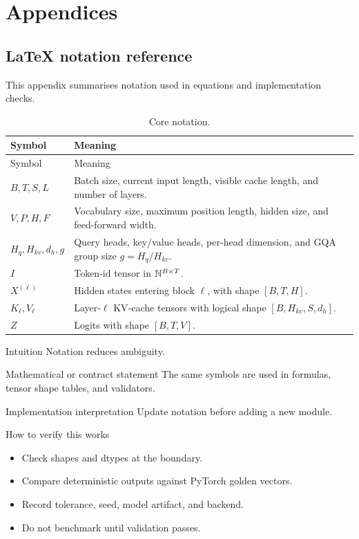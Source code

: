 \part{Appendices}

\chapter{LaTeX notation reference}
\label{app:notation}
This appendix summarises notation used in equations and implementation checks.


{\small
\begin{longtable}{L{0.22\textwidth}L{0.68\textwidth}}
\caption{Core notation.}\\
\toprule
Symbol & Meaning \\
\midrule
\endfirsthead
\toprule
Symbol & Meaning \\
\midrule
\endhead
\(B,T,S,L\) & Batch size, current input length, visible cache length, and number of layers. \\
\(V,P,H,F\) & Vocabulary size, maximum position length, hidden size, and feed-forward width. \\
\(H_q,H_{kv},d_h,g\) & Query heads, key/value heads, per-head dimension, and GQA group size \(g=H_q/H_{kv}\). \\
\(I\) & Token-id tensor in \(\mathbb{N}^{B\times T}\). \\
\(X^{(\ell)}\) & Hidden states entering block \(\ell\), with shape \([B,T,H]\). \\
\(K_\ell,V_\ell\) & Layer-\(\ell\) KV-cache tensors with logical shape \([B,H_{kv},S,d_h]\). \\
\(Z\) & Logits with shape \([B,T,V]\). \\
\bottomrule
\end{longtable}}


\begin{intuitionbox}{Intuition}
Notation reduces ambiguity.
\end{intuitionbox}

\begin{definitionbox}{Mathematical or contract statement}
The same symbols are used in formulas, tensor shape tables, and validators.
\end{definitionbox}

\begin{implementationbox}{Implementation interpretation}
Update notation before adding a new module.
\end{implementationbox}

\begin{verificationbox}{How to verify this works}
\begin{itemize}
\item Check shapes and dtypes at the boundary.
\item Compare deterministic outputs against PyTorch golden vectors.
\item Record tolerance, seed, model artifact, and backend.
\item Do not benchmark until validation passes.
\end{itemize}
\end{verificationbox}

